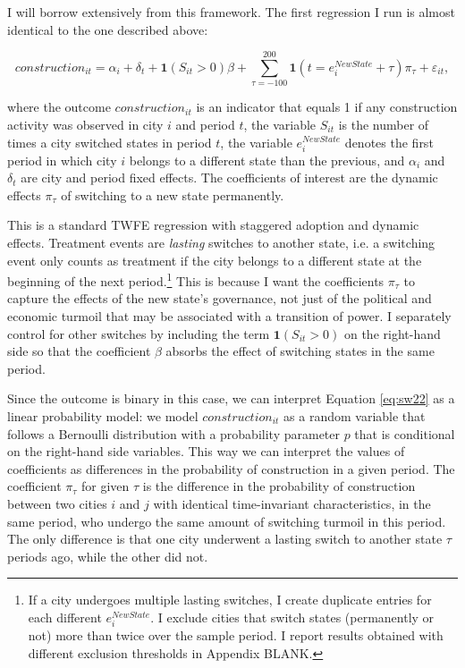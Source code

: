 \documentclass[11pt, a4paper]{article}
\begin{document}
I will borrow extensively from this framework. The first regression I run is almost identical to the one described above:

\begin{equation}
\label{eq:sw22}
    construction_{it} = \alpha_i + \delta_t + \mathbf{1}(S_{it} > 0)\beta + 
    \sum_{\tau = -100}^{200} \mathbf{1}(t = e^{NewState}_i + \tau)\pi_\tau + \varepsilon_{it},
\end{equation}

where the outcome $construction_{it}$ is an indicator that equals 1 if any construction activity was observed in city $i$ and period $t$, the variable $S_{it}$ is the number of times a city switched states in period $t$, the variable $e^{NewState}_i$ denotes the first period in which city $i$ belongs to a different state than the previous, and $\alpha_i$ and $\delta_t$ are city and period fixed effects. The coefficients of interest are the dynamic effects $\pi_\tau$ of switching to a new state permanently. 

This is a standard TWFE regression with staggered adoption and dynamic effects. Treatment events are \textit{lasting} switches to another state, i.e. a switching event only counts as treatment if the city belongs to a different state at the beginning of the next period.\footnote
{
    If a city undergoes multiple lasting switches, I create duplicate entries for each different $e^{NewState}_i$. I exclude cities that switch states (permanently or not) more than twice over the sample period. I report results obtained with different exclusion thresholds in Appendix BLANK.
}
This is because I want the coefficients $\pi_\tau$ to capture the effects of the new state's governance, not just of the political and economic turmoil that may be associated with a transition of power. I separately control for other switches by including the term $\mathbf{1}(S_{it} > 0)$ on the right-hand side so that the coefficient $\beta$ absorbs the effect of switching states in the same period.

Since the outcome is binary in this case, we can interpret Equation \eqref{eq:sw22} as a linear probability model: we model $construction_{it}$ as a random variable that follows a Bernoulli distribution with a probability parameter $p$ that is conditional on the right-hand side variables. This way we can interpret the values of coefficients as differences in the probability of construction in a given period. The coefficient $\pi_\tau$ for given $\tau$ is the difference in the probability of construction between two cities $i$ and $j$ with identical time-invariant characteristics, in the same period, who undergo the same amount of switching turmoil in this period. The only difference is that one city underwent a lasting switch to another state $\tau$ periods ago, while the other did not. 
\end{document}
